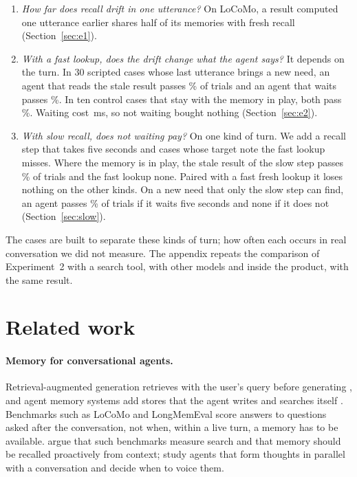 \documentclass[10pt]{article}
\begin{document}
\begin{enumerate}[leftmargin=*,itemsep=2pt,topsep=3pt]
\item \emph{How far does recall drift in one utterance?} On LoCoMo, a result computed one utterance earlier shares half of its memories with fresh recall (Section~\ref{sec:e1}).
\item \emph{With a fast lookup, does the drift change what the agent says?} It depends on the turn. In 30 scripted cases whose last utterance brings a new need, an agent that reads the stale result passes \RecLag\% of trials and an agent that waits passes \RecBlock\%. In ten control cases that stay with the memory in play, both pass \CarryLag\%. Waiting cost \PreBlockMed\,ms, so not waiting bought nothing (Section~\ref{sec:e2}).
\item \emph{With slow recall, does not waiting pay?} On one kind of turn. We add a recall step that takes five seconds and \SNewCases{} cases whose target note the fast lookup misses. Where the memory is in play, the stale result of the slow step passes \SStaleC\% of trials and the fast lookup none. Paired with a fast fresh lookup it loses nothing on the other kinds. On a new need that only the slow step can find, an agent passes \SDeepD\% of trials if it waits five seconds and none if it does not (Section~\ref{sec:slow}).
\end{enumerate}

The cases are built to separate these kinds of turn; how often each occurs in real conversation we did not measure. The appendix repeats the comparison of Experiment~2 with a search tool, with other models and inside the product, with the same result.

\section{Related work}
\label{sec:related}

\paragraph{Memory for conversational agents.} Retrieval-augmented generation retrieves with the user's query before generating \citep{lewis2020rag}, and agent memory systems add stores that the agent writes and searches itself \citep{packer2023memgpt,park2023generative,chhikara2025mem0,xu2025amem,hu2025memoryage}. Benchmarks such as LoCoMo \citep{maharana2024locomo} and LongMemEval \citep{wu2024longmemeval} score answers to questions asked after the conversation, not when, within a live turn, a memory has to be available. \citet{xiao2026memory} argue that such benchmarks measure search and that memory should be recalled proactively from context; \citet{liu2025innerthoughts} study agents that form thoughts in parallel with a conversation and decide when to voice them.
\end{document}
